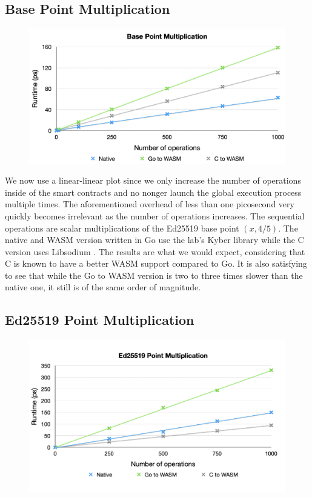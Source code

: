 \documentclass[11pt, a4paper, twoside, openright]{article}
\begin{document}
\subsection{Base Point Multiplication}

\begin{figure}[H]
 \centering
  \includegraphics[width=13cm]{gen_mul.png}
\end{figure}

We now use a linear-linear plot since we only increase the number of operations inside of the smart contracts and no nonger launch the global execution process multiple times. The aforementioned overhead of less than one picosecond very quickly becomes irrelevant as the number of operations increases. The sequential operations are scalar multiplications of the Ed25519 base point $(x, 4/5)$. The native and WASM version written in Go use the lab's Kyber library \cite{kyber} while the C version uses Libsodium \cite{libsodium}. The results are what we would expect, considering that C is known to have a better WASM support compared to Go. It is also satisfying to see that while the Go to WASM version is two to three times slower than the native one, it still is of the same order of magnitude. 

\subsection{Ed25519 Point Multiplication}

\begin{figure}[h]
 \centering
  \includegraphics[width=13cm]{point_mul.png}
\end{figure}
\end{document}
